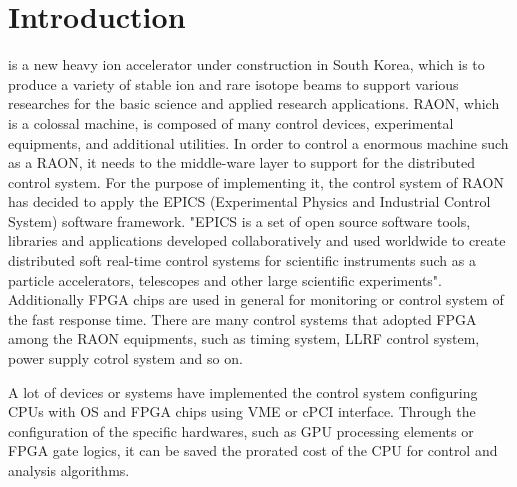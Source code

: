 \documentclass[journal]{IEEEtran}
\begin{document}


\section{Introduction}
% 
% 
% 
% 
 is a new heavy ion accelerator under construction in South Korea, which is to produce a variety of stable ion and rare isotope beams to support various researches for the basic science and applied research applications\cite{risp}. RAON, which is a colossal machine, is composed of many control devices, experimental equipments, and additional utilities. In order to control a enormous machine such as a RAON, it needs to the middle-ware layer to support for the distributed control system. For the purpose of  implementing it, the control system of RAON has decided to apply the EPICS (Experimental Physics and Industrial Control System) software framework. "EPICS is a set of open source software tools, libraries and applications developed collaboratively and used worldwide to create distributed soft real-time control systems for scientific instruments such as a particle accelerators, telescopes and other large scientific experiments"\cite{epics}. Additionally FPGA chips are used in general for monitoring or control system of the fast response time. There are many control systems that adopted FPGA among the RAON equipments, such as timing system, LLRF control system, power supply cotrol system and so on.

A lot of devices or systems have implemented the control system configuring CPUs with OS and FPGA chips using VME or cPCI interface. Through the configuration of the specific hardwares, such as GPU processing elements or FPGA gate logics, it can be saved the prorated cost of the CPU for control and analysis algorithms. 
\end{document}
